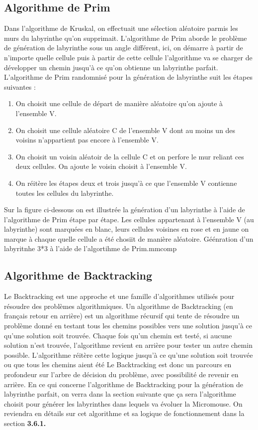 \subsection{Algorithme de Prim}
Dans l'algorithme de Kruskal, on effectuait une sélection aléatoire parmis les murs du labyrinthe qu'on supprimait. L'algorithme de Prim aborde le problème de génération de labyrinthe sous un angle différent, ici, on démarre à partir de n'importe quelle cellule puis à partir de cette cellule l'algorithme va se charger de développer un chemin jusqu'à ce qu'on obtienne un labyrinthe parfait.
L'algorithme de Prim randomnisé pour la génération de labyrinthe suit les étapes suivantes :

\begin{enumerate}
    \item On choisit une cellule de départ de manière aléatoire qu'on ajoute à l'ensemble V.
    \item On choisit une cellule aléatoire C de l'ensemble V dont au moins un des voisins n'appartient pas encore à l'ensemble V. 
    \item On choisit un voisin aléatoir de la cellule C et on perfore le mur reliant ces deux cellules. On ajoute le voisin choisit à l'ensemble V. 
    \item On réitère les étapes deux et trois jusqu'à ce que l'ensemble V contienne toutes les cellules du labyrinthe.
\end{enumerate}
\newpage
Sur la figure ci-dessous on est illustrée la génération d'un labyrinthe à l'aide de l'algorithme de Prim étape par étape. Les cellules appartenant à l'ensemble V (au labyrinthe) sont marquées en blanc, leurs cellules voisines en rose et en jaune on marque à chaque quelle cellule a été chosiit de manière aléatoire.
{Géénration d'un labyritnhe 3*3 à l'aide de l'algortihme de Prim.}{mmcomp}

\subsection{Algorithme de Backtracking}
Le Backtracking est une approche et une famille d'algorithmes utilisés pour résoudre des problèmes algorithmiques.
Un algorithme de Backtracking (en français retour en arrière) est un algorithme récursif qui tente de résoudre un problème donné en testant tous les chemins possibles vers une solution jusqu'à ce qu'une solution soit trouvée. 
Chaque fois qu'un chemin est testé, si aucune solution n'est trouvée, l'algorithme revient en arrière pour tester un autre chemin possible. L'algorithme réitère cette logique jusqu'à ce qu'une solution soit trouvée ou que tous les chemins aient été Le Backtracking est donc un parcours en profondeur sur l'arbre de décision du problème, avec possibilité de revenir en arrière. En ce qui concerne l'algorithme de Backtracking pour la génération de labyrinthe parfait, on verra dans la section suivante que ça sera l'algorithme choisit pour générer les labyrinthes dans lequels va évoluer la Micromouse. On reviendra en détails sur cet algorithme et sa logique de fonctionnement dans la section \textbf{3.6.1.}

